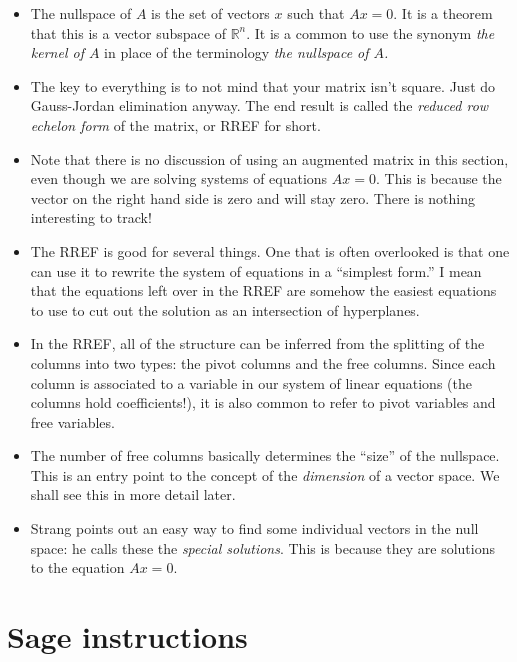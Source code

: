 \documentclass[11pt]{amsart}
\theoremstyle{definition}
\begin{document}
\begin{itemize}

\item The nullspace of $A$ is the set of vectors $x$ such that $Ax=0$. It is a theorem that this is a vector subspace of $\mathbb{R}^n$. It is a common to use the synonym \emph{the kernel of $A$} in place of the terminology \emph{the nullspace of $A$.}

\item The key to everything is to not mind that your matrix isn't square. Just do Gauss-Jordan elimination anyway. The end result is called the \emph{reduced row echelon form} of the matrix, or RREF for short.

\item Note that there is no discussion of using an augmented matrix in this section, even though we are solving systems of equations $Ax=0$. This is because the vector on the right hand side is zero and will stay zero. There is nothing interesting to track!

\item The RREF is good for several things. One that is often overlooked is that one can use it to rewrite the system of equations in a ``simplest form.'' I mean that the equations left over in the RREF are somehow the easiest equations to use to cut out the solution as an intersection of hyperplanes.

\item In the RREF, all of the structure can be inferred from the splitting of the columns into two types: the pivot columns and the free columns. Since each column is associated to a variable in our system of linear equations (the columns hold coefficients!), it is also common to refer to pivot variables and free variables.

\item The number of free columns basically determines the ``size'' of the nullspace. This is an entry point to the concept of the \emph{dimension} of a vector space. We shall see this in more detail later.

\item Strang points out an easy way to find some individual vectors in the null space: he calls these the \emph{special solutions}. This is because they are solutions to the equation $Ax=0$.

\end{itemize}


\section{Sage instructions}
\end{document}
